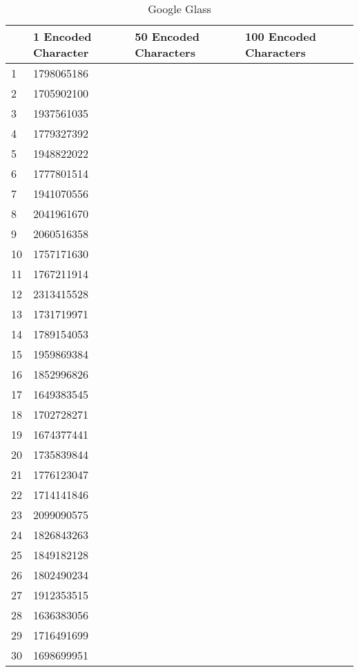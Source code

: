 	\begin{table}[ht!]
    		\caption{Google Glass} \label{tab:distamceSmartphoneFull}
		\centering \begin{tabularx}{\textwidth}{l|X|X|X} \hline
		& \textbf{1 Encoded Character} & \textbf{50 Encoded Characters} & \textbf{100 Encoded Characters} \\ \hline \hline

		1&	1798065186	&		&		\\ \hline
		2&	1705902100	&		&		\\ \hline
		3&	1937561035	&		&		\\ \hline
		4&	1779327392	&		&		\\ \hline
		5&	1948822022	&		&		\\ \hline
		6&	1777801514	&		&		\\ \hline
		7&	1941070556	&		&		\\ \hline
		8&	2041961670	&		&		\\ \hline
		9&	2060516358	&		&		\\ \hline
		10&	1757171630	&		&		\\ \hline
		11&	1767211914	&		&		\\ \hline
		12&	2313415528	&		&		\\ \hline
		13&	1731719971	&		&		\\ \hline
		14&	1789154053	&		&		\\ \hline
		15&	1959869384	&		&		\\ \hline
		16&	1852996826	&		&		\\ \hline
		17&	1649383545	&		&		\\ \hline
		18&	1702728271	&		&		\\ \hline
		19&	1674377441	&		&		\\ \hline
		20&	1735839844	&		&		\\ \hline
		21&	1776123047	&		&		\\ \hline
		22&	1714141846	&		&		\\ \hline
		23&	2099090575	&		&		\\ \hline
		24&	1826843263	&		&		\\ \hline
		25&	1849182128	&		&		\\ \hline
		26&	1802490234	&		&		\\ \hline
		27&	1912353515	&		&		\\ \hline
		28&	1636383056	&		&		\\ \hline
		29&	1716491699	&		&		\\ \hline
		30&	1698699951	&		&		\\ \hline
		
		\end{tabularx}
	\end{table}

